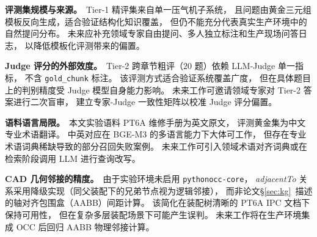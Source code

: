 \textbf{评测集规模与来源。}~Tier-1 精评集来自单一压气机子系统，
且问题由黄金三元组模板反向生成，适合验证结构化知识覆盖，
但仍不能充分代表真实生产环境中的自然提问分布。
未来应补充领域专家自由提问、多人独立标注和生产现场问答日志，
以降低模板化评测带来的偏置。

\textbf{Judge 评分的外部效度。}~Tier-2 跨章节粗评（20 题）依赖 LLM-Judge 单一指标，
不含 \texttt{gold\_chunk} 标注。
该评测方式适合验证系统覆盖广度，
但在具体题目上的判别精度受 Judge 模型自身能力影响。
未来工作可邀请领域专家对 Tier-2 答案进行二次盲审，
建立专家-Judge 一致性矩阵以校准 Judge 评分偏置。

\textbf{语料语言局限。}~本文实验语料 PT6A 维修手册为英文原文，
评测黄金集为中文专业术语翻译。
中英对应在 BGE-M3 的多语言能力下大体可工作，
但存在专业术语词典稀缺导致的部分召回失败案例。
未来工作可引入领域术语对齐词典或在检索阶段调用 LLM 进行查询改写。

\textbf{CAD 几何邻接的精度。}~由于实验环境未启用 \texttt{pythonocc-core}，
\textit{adjacentTo} 关系采用降级实现（同父装配下的兄弟节点视为逻辑邻接），
而非论文§\ref{sec:kg}~描述的轴对齐包围盒（AABB）间距计算。
该简化在装配树清晰的 PT6A IPC 文档下保持可用性，
但在复杂多层装配场景下可能产生误判。
未来工作将在生产环境集成 OCC 后回归 AABB 物理邻接计算。
